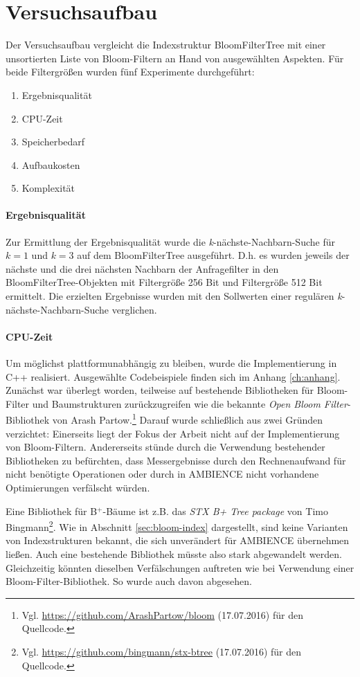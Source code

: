 \section{Versuchsaufbau}\label{sec:versuchsaufbau}
Der Versuchsaufbau vergleicht die Indexstruktur BloomFilterTree mit einer unsortierten Liste von Bloom-Filtern an Hand von ausgewählten Aspekten. Für beide Filtergrößen wurden fünf Experimente durchgeführt:  
\begin{enumerate}
\setlength{\itemsep}{20pt}
	\item Ergebnisqualität
	\item CPU-Zeit 
	\item Speicherbedarf 
	\item Aufbaukosten
	\item Komplexität
\end{enumerate}
\paragraph*{Ergebnisqualität}
Zur Ermittlung der Ergebnisqualität wurde die \textit{k}-nächste-Nachbarn-Suche für $k=1$ und $k=3$ auf dem BloomFilterTree ausgeführt. D.h. es wurden jeweils der nächste und die drei nächsten Nachbarn der Anfragefilter in den BloomFilterTree-Objekten mit Filtergröße 256 Bit und Filtergröße 512 Bit ermittelt. Die erzielten Ergebnisse wurden mit den Sollwerten einer regulären \textit{k}-nächste-Nachbarn-Suche verglichen. 
\paragraph*{CPU-Zeit}
Um möglichst plattformunabhängig zu bleiben, wurde die Implementierung in C++ realisiert. Ausgewählte Codebeispiele finden sich im Anhang \ref{ch:anhang}. Zunächst war überlegt worden, teilweise auf bestehende Bibliotheken für Bloom-Filter und Baumstrukturen zurückzugreifen wie die bekannte \textit{Open Bloom Filter}-Bibliothek von Arash Partow.\footnote{Vgl. \url{https://github.com/ArashPartow/bloom} (17.07.2016) für den Quellcode.} Darauf wurde schließlich aus zwei Gründen verzichtet: Einerseits liegt der Fokus der Arbeit nicht auf der Implementierung von Bloom-Filtern. Andererseits stünde durch die Verwendung bestehender Bibliotheken zu befürchten, dass Messergebnisse durch den Rechnenaufwand für nicht benötigte Operationen oder durch in AMBIENCE nicht vorhandene Optimierungen verfälscht würden. 

Eine Bibliothek für B$^+$-Bäume ist z.B. das \textit{STX B+ Tree package} von Timo Bingmann\footnote{Vgl. \url{https://github.com/bingmann/stx-btree} (17.07.2016) für den Quellcode.}. Wie in Abschnitt \ref{sec:bloom-index} dargestellt, sind keine Varianten von Indexstrukturen bekannt, die sich unverändert für AMBIENCE übernehmen ließen. Auch eine bestehende Bibliothek müsste also stark abgewandelt werden. Gleichzeitig könnten dieselben Verfälschungen auftreten wie bei Verwendung einer Bloom-Filter-Bibliothek. So wurde auch davon abgesehen.

